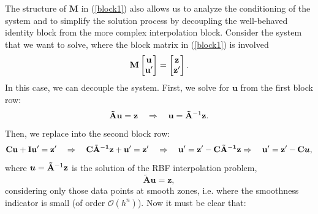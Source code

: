 \documentclass[preprint]{elsarticle}       %
\begin{document}
The structure of {\bf M} in (\ref{block1}) also allows us 
to analyze the conditioning of the system and to simplify the solution process by decoupling the well-behaved identity block from the more complex interpolation block. Consider the system that we want to solve, where the block matrix in (\ref{block1}) is involved
\[
{\bf M} \begin{bmatrix} \mathbf{u} \\ \mathbf{u}' \end{bmatrix} = \begin{bmatrix} \mathbf{z} \\ \mathbf{z}' \end{bmatrix}.
\]
In this case, we can %
decouple the system. First,  we solve for $\mathbf{u}$ from the first block row:
\[
{\bf \tilde A} \mathbf{u} = \mathbf{z}  \quad \Rightarrow \quad \mathbf{u} = {\bf \tilde A}^{-1} \mathbf{z} .
\]
Then, we replace into the second block row:
\begin{equation}\label{flechas}
\bf{C} \mathbf{u} + \bf{I} \mathbf{u}' = \mathbf{z}' \quad \Rightarrow \quad \bf{C} {\bf \tilde A}^{-1} \mathbf{z} + \mathbf{u}' = \mathbf{z}' 
\quad \Rightarrow \quad \mathbf{u}' = \mathbf{z}'- \bf{C} {\bf \tilde A}^{-1} \mathbf{z} \Rightarrow \quad \mathbf{u}' = \mathbf{z}' - \bf{C} \boldsymbol{u},
\end{equation}
where $\boldsymbol{u}={\bf \tilde A}^{-1} \mathbf{z}$ is the solution of the RBF interpolation problem,
\begin{equation}\label{sistema_b}
\mathbf{\tilde A} \boldsymbol{u} = \mathbf{z},
\end{equation}
considering only those data points at smooth zones, i.e. where the smoothness indicator is small (of order $\mathcal{O}(h^n)$).
Now it must be clear that:
\end{document}
